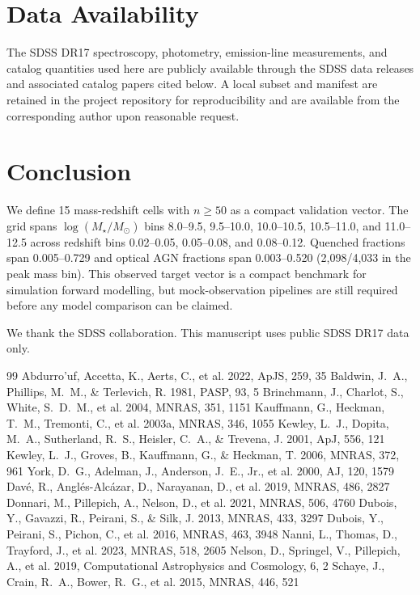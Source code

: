 \documentclass[twocolumn]{aastex631}
\begin{document}
\section{Data Availability}\label{sec:data-avail}
The SDSS DR17 spectroscopy, photometry, emission-line measurements, and catalog quantities used here are publicly available through the SDSS data releases and associated catalog papers cited below. A local subset and manifest are retained in the project repository for reproducibility and are available from the corresponding author upon reasonable request.

\section{Conclusion}\label{sec:conclusion}
We define 15 mass-redshift cells with $n \geq 50$ as a compact validation vector. The grid spans $\log(M_\star/M_\odot)$ bins 8.0--9.5, 9.5--10.0, 10.0--10.5, 10.5--11.0, and 11.0--12.5 across redshift bins 0.02--0.05, 0.05--0.08, and 0.08--0.12. Quenched fractions span 0.005--0.729 and optical AGN fractions span 0.003--0.520 (2,098/4,033 in the peak mass bin). This observed target vector is a compact benchmark for simulation forward modelling, but mock-observation pipelines are still required before any model comparison can be claimed.

\begin{acknowledgments}
We thank the SDSS collaboration. This manuscript uses public SDSS DR17 data only.
\end{acknowledgments}
\begin{thebibliography}{99}
 Abdurro'uf, Accetta, K., Aerts, C., et al. 2022, ApJS, 259, 35
 Baldwin, J.~A., Phillips, M.~M., \& Terlevich, R. 1981, PASP, 93, 5
 Brinchmann, J., Charlot, S., White, S.~D.~M., et al. 2004, MNRAS, 351, 1151
 Kauffmann, G., Heckman, T.~M., Tremonti, C., et al. 2003a, MNRAS, 346, 1055
 Kewley, L.~J., Dopita, M.~A., Sutherland, R.~S., Heisler, C.~A., \& Trevena, J. 2001, ApJ, 556, 121
 Kewley, L.~J., Groves, B., Kauffmann, G., \& Heckman, T. 2006, MNRAS, 372, 961
 York, D.~G., Adelman, J., Anderson, J.~E., Jr., et al. 2000, AJ, 120, 1579
 Dav\'e, R., Angl\'es-Alc\'azar, D., Narayanan, D., et al. 2019, MNRAS, 486, 2827
 Donnari, M., Pillepich, A., Nelson, D., et al. 2021, MNRAS, 506, 4760
 Dubois, Y., Gavazzi, R., Peirani, S., \& Silk, J. 2013, MNRAS, 433, 3297
 Dubois, Y., Peirani, S., Pichon, C., et al. 2016, MNRAS, 463, 3948
 Nanni, L., Thomas, D., Trayford, J., et al. 2023, MNRAS, 518, 2605
 Nelson, D., Springel, V., Pillepich, A., et al. 2019, Computational Astrophysics and Cosmology, 6, 2
 Schaye, J., Crain, R.~A., Bower, R.~G., et al. 2015, MNRAS, 446, 521
\end{thebibliography}
\end{document}
